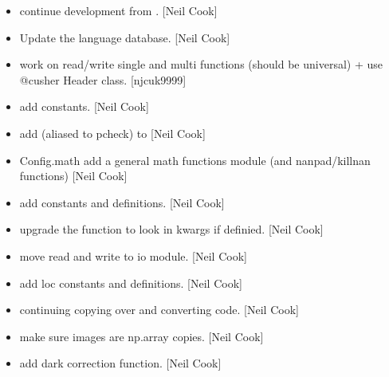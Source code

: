 \documentclass[a4paper,10pt,english]{report}
\begin{document}
\begin{itemize}
\item {} 
 \sphinxhyphen{} continue development from . {[}Neil Cook{]}

\item {} 
Update the language database. {[}Neil Cook{]}

\item {} 
 \sphinxhyphen{} work on read/write single and multi functions (should be
universal) + use @cusher Header class. {[}njcuk9999{]}

\item {} 
 \sphinxhyphen{} add  constants. {[}Neil Cook{]}

\item {} 
 \sphinxhyphen{} add  (aliased to pcheck) to 
{[}Neil Cook{]}

\item {} 
Config.math \sphinxhyphen{} add a general math functions module (and nanpad/killnan
functions) {[}Neil Cook{]}

\item {} 
 \sphinxhyphen{} add  constants and
definitions. {[}Neil Cook{]}

\item {} 
 \sphinxhyphen{} upgrade the  function to look in kwargs if
definied. {[}Neil Cook{]}

\item {} 
 \sphinxhyphen{} move read and write to io module. {[}Neil Cook{]}

\item {} 
 \sphinxhyphen{} add loc constants and definitions. {[}Neil
Cook{]}

\item {} 
 \sphinxhyphen{} continuing copying over and converting code. {[}Neil
Cook{]}

\item {} 
 \sphinxhyphen{} make sure images are np.array copies. {[}Neil
Cook{]}

\item {} 
 \sphinxhyphen{} add dark correction function. {[}Neil Cook{]}


\end{itemize}
\end{document}

